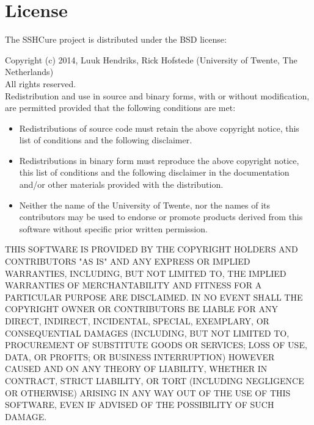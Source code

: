 \cleardoublepage

\section*{License}
\label{sec:license}

The SSHCure project is distributed under the BSD license:

\vspace{2 mm}

\noindent
Copyright (c) 2014, Luuk Hendriks, Rick Hofstede (University of Twente, The Netherlands) \\
All rights reserved. \\

\noindent
Redistribution and use in source and binary forms, with or without modification, are permitted provided that the following conditions are met:

\begin{itemize}
	\item Redistributions of source code must retain the above 
		copyright notice, this list of conditions and the following 
		disclaimer.
	\item Redistributions in binary form must reproduce the above 
		copyright notice, this list of conditions and the following 
		disclaimer in the documentation and/or other materials 
		provided with the distribution.
	\item Neither the name of the University of Twente, nor the
		names of its contributors may be used to endorse or
		promote products derived from this software without
		specific prior written permission.
\end{itemize}

THIS SOFTWARE IS PROVIDED BY THE COPYRIGHT HOLDERS AND CONTRIBUTORS "AS IS" AND ANY EXPRESS OR IMPLIED WARRANTIES, INCLUDING, BUT NOT LIMITED TO, THE IMPLIED WARRANTIES OF MERCHANTABILITY AND FITNESS FOR A PARTICULAR PURPOSE ARE DISCLAIMED. IN NO EVENT SHALL THE COPYRIGHT OWNER OR CONTRIBUTORS BE LIABLE FOR ANY DIRECT, INDIRECT, INCIDENTAL, SPECIAL, EXEMPLARY, OR CONSEQUENTIAL DAMAGES (INCLUDING, BUT NOT LIMITED TO, PROCUREMENT OF SUBSTITUTE GOODS OR SERVICES; LOSS OF USE, DATA, OR PROFITS; OR BUSINESS INTERRUPTION) HOWEVER CAUSED AND ON ANY THEORY OF LIABILITY, WHETHER IN CONTRACT, STRICT LIABILITY, OR TORT (INCLUDING NEGLIGENCE OR OTHERWISE) ARISING IN ANY WAY OUT OF THE USE OF THIS SOFTWARE, EVEN IF ADVISED OF THE POSSIBILITY OF SUCH DAMAGE.
